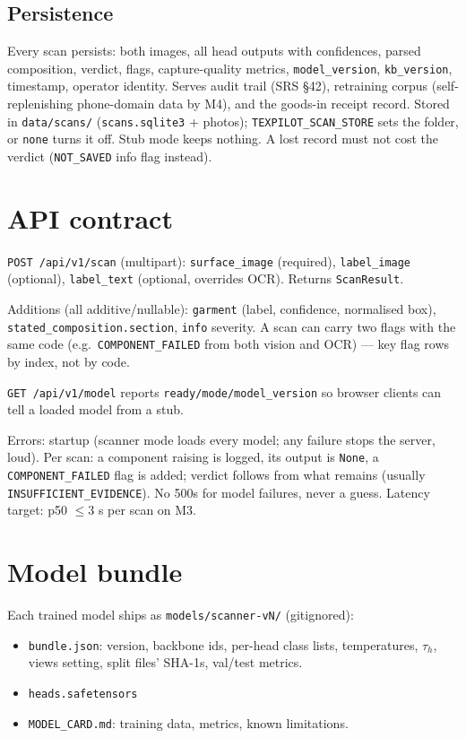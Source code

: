 \documentclass[11pt,a4paper]{article}
\begin{document}
\subsection{Persistence}

Every scan persists: both images, all head outputs with confidences, parsed
composition, verdict, flags, capture-quality metrics, \texttt{model\_version},
\texttt{kb\_version}, timestamp, operator identity. Serves audit trail (SRS \S 42),
retraining corpus (self-replenishing phone-domain data by M4), and the goods-in
receipt record. Stored in \texttt{data/scans/} (\texttt{scans.sqlite3} + photos);
\texttt{TEXPILOT\_SCAN\_STORE} sets the folder, or \texttt{none} turns it off.
Stub mode keeps nothing. A lost record must not cost the verdict (\texttt{NOT\_SAVED}
info flag instead).

\section{API contract}

\texttt{POST /api/v1/scan} (multipart): \texttt{surface\_image} (required),
\texttt{label\_image} (optional), \texttt{label\_text} (optional, overrides OCR).
Returns \texttt{ScanResult}.

Additions (all additive/nullable): \texttt{garment} (label, confidence, normalised
box), \texttt{stated\_composition.section}, \texttt{info} severity. A scan can
carry two flags with the same code (e.g.\ \texttt{COMPONENT\_FAILED} from both
vision and OCR) --- key flag rows by index, not by code.

\texttt{GET /api/v1/model} reports \texttt{ready/mode/model\_version} so browser
clients can tell a loaded model from a stub.

Errors: startup (scanner mode loads every model; any failure stops the server, loud).
Per scan: a component raising is logged, its output is \texttt{None}, a
\texttt{COMPONENT\_FAILED} flag is added; verdict follows from what remains
(usually \texttt{INSUFFICIENT\_EVIDENCE}). No 500s for model failures, never a
guess. Latency target: p50 $\le 3$ s per scan on M3.

\section{Model bundle}

Each trained model ships as \texttt{models/scanner-vN/} (gitignored):
\begin{itemize}[leftmargin=*]
  \item \texttt{bundle.json}: version, backbone ids, per-head class lists,
        temperatures, $\tau_h$, views setting, split files' SHA-1s, val/test metrics.
  \item \texttt{heads.safetensors}
  \item \texttt{MODEL\_CARD.md}: training data, metrics, known limitations.
\end{itemize}
\end{document}
